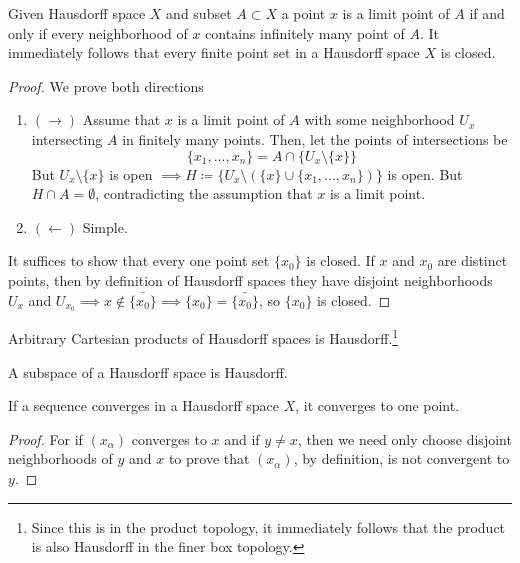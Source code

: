   \begin{theorem}
    Given Hausdorff space $X$ and subset $A \subset X$ a point $x$ is a limit point of $A$ if and only if every neighborhood of $x$ contains infinitely many point of $A$. It immediately follows that every finite point set in a Hausdorff space $X$ is closed. 
  \end{theorem}
  \begin{proof}
    We prove both directions
    \begin{enumerate}
      \item $(\rightarrow)$ Assume that $x$ is a limit point of $A$ with some neighborhood $U_x$ intersecting $A$ in finitely many points. Then, let the points of intersections be 
      \begin{equation}
        \{x_1, ..., x_n\} = A \cap \{U_x \setminus \{x\} \}
      \end{equation}
      But $U_x \setminus \{x\}$ is open $\implies H \coloneqq \{U_x \setminus ( \{x\} \cup \{x_1, ..., x_n\})\}$ is open. But $H \cap A = \emptyset$, contradicting the assumption that $x$ is a limit point. 

      \item $(\leftarrow)$ Simple. 
    \end{enumerate}
    It suffices to show that every one point set $\{x_0\}$ is closed. If $x$ and $x_0$ are distinct points, then by definition of Hausdorff spaces they have disjoint neighborhoods $U_x$ and $U_{x_0} \implies x \not\in \bar{\{x_0\}} \implies \{x_0\} = \bar{\{x_0\}}$, so $\{x_0\}$ is closed. 
  \end{proof}

  \begin{lemma}
    Arbitrary Cartesian products of Hausdorff spaces is Hausdorff.\footnote{Since this is in the product topology, it immediately follows that the product is also Hausdorff in the finer box topology.}
  \end{lemma}

  \begin{lemma}
    A subspace of a Hausdorff space is Hausdorff. 
  \end{lemma}

  \begin{theorem}
    If a sequence converges in a Hausdorff space $X$, it converges to one point. 
  \end{theorem}
  \begin{proof}
    For if $(x_\alpha)$ converges to $x$ and if $y \neq x$, then we need only choose disjoint neighborhoods of $y$ and $x$ to prove that $(x_\alpha)$, by definition, is not convergent to $y$.
  \end{proof}

